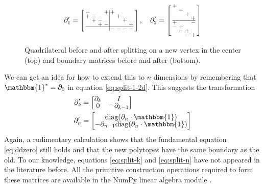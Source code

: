 \documentclass[twocolumn]{article}
\makeatletter
\newenvironment{smallarray}[1]
 {\null\,\vcenter\bgroup\scriptsize
  \renewcommand{\arraystretch}{0.7}%
  \arraycolsep=.13885em
  \hbox\bgroup$\array{@{}#1@{}}}
 {\endarray$\egroup\egroup\,\null}
\makeatother
\begin{document}
\begin{figure}[h]
    \begin{equation*}
        \partial_1' = \left[\begin{smallarray}{cccc|cccc}
            - &   &   & + & + &   &   &   \\
            + & - &   &   &   & + &   &   \\
              & + & - &   &   &   & + &   \\
              &   & + & - &   &   &   & + \\
            \hline
              &   &   &   & - & - & - & -
        \end{smallarray}\right], \quad
        \partial_2' = \left[\begin{smallarray}{cccc}
            + &   &   &   \\
              & + &   &   \\
              &   & + &   \\
              &   &   & + \\
            \hline
            + &   &   & - \\
            - & + &   &   \\
              & - & + &   \\
              &   & - & +
        \end{smallarray}\right]
    \end{equation*}

    \caption{Quadrilateral before and after splitting on a new vertex in the center (top) and boundary matrices before and after (bottom).}
    \label{fig:split-transformation}
\end{figure}

We can get an idea for how to extend this to $n$ dimensions by remembering that $\mathbbm{1}^* = \partial_0$ in equation \eqref{eq:split-1-2d}.
This suggests the transformation
\begin{align}
    \partial_k' & = \left[\begin{matrix}\partial_k & I \\ 0 & -\partial_{k - 1}\end{matrix}\right] \label{eq:split-k} \\
    \partial_n' & = \left[\begin{matrix}\text{diag}(\partial_n\cdot\mathbbm{1}) \\ -\partial_{n - 1}\text{diag}(\partial_n\cdot\mathbbm{1})\end{matrix}\right] \label{eq:split-n}
\end{align}
Again, a rudimentary calculation shows that the fundamental equation \eqref{eq:ddzero} still holds and that the new polytopes have the same boundary as the old.
To our knowledge, equations \eqref{eq:split-k} and \eqref{eq:split-n} have not appeared in the literature before.
All the primitive construction operations required to form these matrices are available in the NumPy linear algebra module \cite{harris2020array}.
\end{document}
